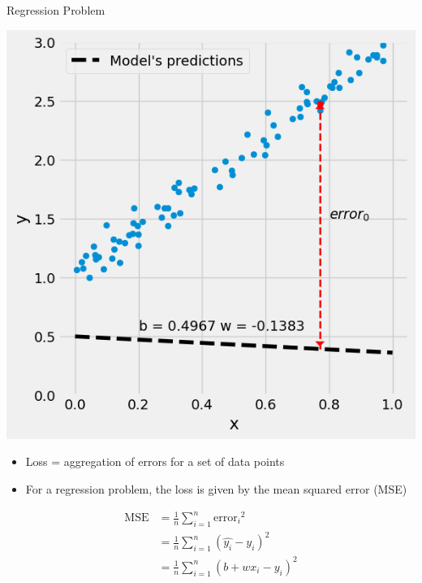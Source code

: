 \documentclass[pdflatex,compress,mathserif]{beamer}
\begin{document}
\begin{frame}{Regression Problem}
	\begin{multicols}{2}
		\begin{center}
			\includegraphics[width=\linewidth]{img/04}
		\end{center}
		\columnbreak
		\begin{itemize}
			\item Loss = aggregation of errors for a set of data points
			\item For a regression problem, the loss is given by the mean squared error (MSE)
		\end{itemize}
		$$
		\begin{aligned}
			\text{MSE} &= \frac{1}{n} \sum_{i=1}^n{\text{error}_i}^2
			\\
			&= \frac{1}{n} \sum_{i=1}^n{(\hat{y_i} - y_i)}^2
			\\
			&= \frac{1}{n} \sum_{i=1}^n{(b + w x_i - y_i)}^2
		\end{aligned}
		$$
	\end{multicols}
\end{frame}
\end{document}
